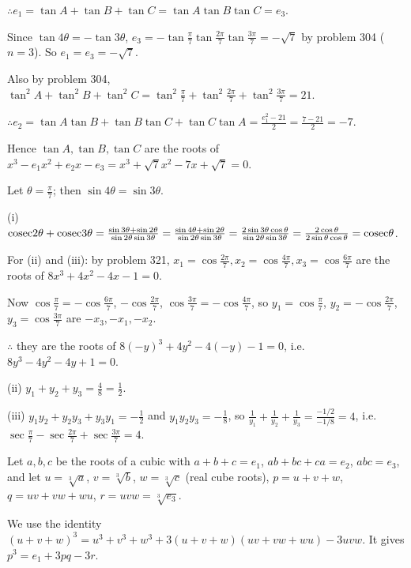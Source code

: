   $\therefore e_1 = \tan A + \tan B + \tan C = \tan A\tan B\tan C = e_3$.

  Since $\tan4\theta = -\tan3\theta$, $e_3 = -\tan\frac{\pi}{7}\tan\frac{2\pi}{7}\tan\frac{3\pi}{7} = -\sqrt{7}$ by
  problem 304 ($n = 3$). So $e_1 = e_3 = -\sqrt{7}$.

  Also by problem 304, $\tan^2A + \tan^2B + \tan^2C = \tan^2\frac{\pi}{7} + \tan^2\frac{2\pi}{7}
  + \tan^2\frac{3\pi}{7} = 21$.

  $\therefore e_2 = \tan A\tan B + \tan B\tan C + \tan C\tan A = \frac{e_1^2 - 21}{2} = \frac{7 - 21}{2} = -7$.

  Hence $\tan A, \tan B, \tan C$ are the roots of $x^3 - e_1x^2 + e_2x - e_3 = x^3 + \sqrt{7}x^2 - 7x + \sqrt{7} = 0$.
\item Let $\theta = \frac{\pi}{7}$; then $\sin4\theta = \sin3\theta$.

  (i) ${\rm cosec}2\theta + {\rm cosec}3\theta = \frac{\sin3\theta + \sin2\theta}{\sin2\theta\sin3\theta}
  = \frac{\sin4\theta + \sin2\theta}{\sin2\theta\sin3\theta} = \frac{2\sin3\theta\cos\theta}{\sin2\theta\sin3\theta}
  = \frac{2\cos\theta}{2\sin\theta\cos\theta} = {\rm cosec}\theta$.

  For (ii) and (iii): by problem 321, $x_1 = \cos\frac{2\pi}{7}, x_2 = \cos\frac{4\pi}{7}, x_3 =
  \cos\frac{6\pi}{7}$ are the roots of $8x^3 + 4x^2 - 4x - 1 = 0$.

  Now $\cos\frac{\pi}{7} = -\cos\frac{6\pi}{7}$, $-\cos\frac{2\pi}{7}$, $\cos\frac{3\pi}{7} = -\cos\frac{4\pi}{7}$,
  so $y_1 = \cos\frac{\pi}{7}$, $y_2 = -\cos\frac{2\pi}{7}$, $y_3 = \cos\frac{3\pi}{7}$ are $-x_3, -x_1, -x_2$.

  $\therefore$ they are the roots of $8(-y)^3 + 4y^2 - 4(-y) - 1 = 0$, i.e.\ $8y^3 - 4y^2 - 4y + 1 = 0$.

  (ii) $y_1 + y_2 + y_3 = \frac{4}{8} = \frac{1}{2}$.

  (iii) $y_1y_2 + y_2y_3 + y_3y_1 = -\frac{1}{2}$ and $y_1y_2y_3 = -\frac{1}{8}$, so $\frac{1}{y_1} + \frac{1}{y_2}
  + \frac{1}{y_3} = \frac{-1/2}{-1/8} = 4$, i.e.\ $\sec\frac{\pi}{7} - \sec\frac{2\pi}{7} + \sec\frac{3\pi}{7} = 4$.
\item Let $a, b, c$ be the roots of a cubic with $a + b + c = e_1$, $ab + bc + ca = e_2$, $abc = e_3$, and let
  $u = \sqrt[3]{a}$, $v = \sqrt[3]{b}$, $w = \sqrt[3]{c}$ (real cube roots), $p = u + v + w$, $q = uv + vw + wu$,
  $r = uvw = \sqrt[3]{e_3}$.

  We use the identity $(u + v + w)^3 = u^3 + v^3 + w^3 + 3(u + v + w)(uv + vw + wu) - 3uvw$. It gives $p^3 = e_1
  + 3pq - 3r$.

